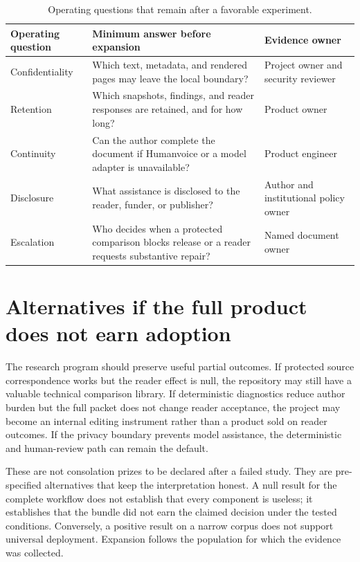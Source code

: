 \begin{table}[H]
\centering
\small
\begin{tabularx}{\textwidth}{@{}p{}L L@{}}
\toprule
Operating question & Minimum answer before expansion & Evidence owner \\
\midrule
Confidentiality & Which text, metadata, and rendered pages may leave the local
boundary? & Project owner and security reviewer \\
Retention & Which snapshots, findings, and reader responses are retained, and
for how long? & Product owner \\
Continuity & Can the author complete the document if Humanvoice or a model
adapter is unavailable? & Product engineer \\
Disclosure & What assistance is disclosed to the reader, funder, or publisher?
& Author and institutional policy owner \\
Escalation & Who decides when a protected comparison blocks release or a
reader requests substantive repair? & Named document owner \\
\bottomrule
\end{tabularx}
\caption{Operating questions that remain after a favorable experiment.}
\label{tab:research-operating-model}
\end{table}

\section{Alternatives if the full product does not earn adoption}

The research program should preserve useful partial outcomes. If protected
source correspondence works but the reader effect is null, the repository may
still have a valuable technical comparison library. If deterministic
diagnostics reduce author burden but the full packet does not change reader
acceptance, the project may become an internal editing instrument rather than
a product sold on reader outcomes. If the privacy boundary prevents model
assistance, the deterministic and human-review path can remain the default.

These are not consolation prizes to be declared after a failed study. They are
pre-specified alternatives that keep the interpretation honest. A null result
for the complete workflow does not establish that every component is useless;
it establishes that the bundle did not earn the claimed decision under the
tested conditions. Conversely, a positive result on a narrow corpus does not
support universal deployment. Expansion follows the population for which
the evidence was collected.

